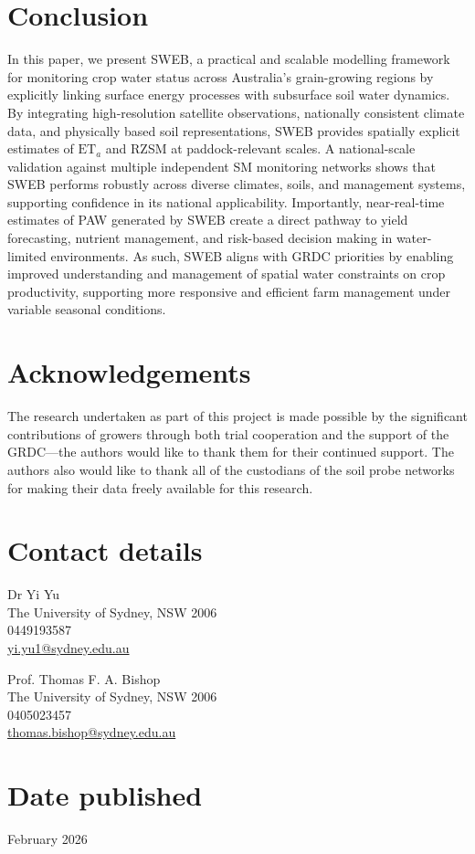 \documentclass[11pt,a4paper]{article}
\begin{document}
\newpage

\section{Conclusion}

In this paper, we present SWEB, a practical and scalable modelling framework for monitoring crop water status across Australia's grain-growing regions by explicitly linking surface energy processes with subsurface soil water dynamics. By integrating high-resolution satellite observations, nationally consistent climate data, and physically based soil representations, SWEB provides spatially explicit estimates of $\mathrm{ET}_{a}$ and RZSM at paddock-relevant scales. A national-scale validation against multiple independent SM monitoring networks shows that SWEB performs robustly across diverse climates, soils, and management systems, supporting confidence in its national applicability. Importantly, near-real-time estimates of PAW generated by SWEB create a direct pathway to yield forecasting, nutrient management, and risk-based decision making in water-limited environments. As such, SWEB aligns with GRDC priorities by enabling improved understanding and management of spatial water constraints on crop productivity, supporting more responsive and efficient farm management under variable seasonal conditions.

\section{Acknowledgements}

The research undertaken as part of this project is made possible by the significant contributions of growers through both trial cooperation and the support of the GRDC---the authors would like to thank them for their continued support. The authors also would like to thank all of the custodians of the soil probe networks for making their data freely available for this research.




\section{Contact details}

Dr Yi Yu\\
The University of Sydney, NSW 2006\\
0449193587\\
\href{mailto:yi.yu1@sydney.edu.au}{yi.yu1@sydney.edu.au}

Prof. Thomas F. A. Bishop\\
The University of Sydney, NSW 2006\\
0405023457\\
\href{mailto:thomas.bishop@sydney.edu.au}{thomas.bishop@sydney.edu.au}

\section{Date published}

February 2026
\end{document}
